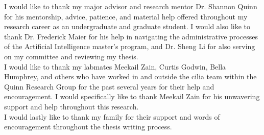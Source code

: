 \documentclass[./dissertation.tex]{subfiles}
\begin{document}
  
  I would like to thank my major advisor and research mentor Dr. Shannon Quinn for his mentorship, advice, patience, and material help offered throughout my research career as an undergraduate and graduate student. I would also like to thank Dr. Frederick Maier for his help in navigating the administrative processes of the Artificial Intelligence master's program, and Dr. Sheng Li for also serving on my committee and reviewing my thesis. \\
  
  I would like to thank my labmates Meekail Zain, Curtis Godwin, Bella Humphrey, and others who have worked in and outside the cilia team within the Quinn Research Group for the past several years for their help and encouragement. I would specifically like to thank Meekail Zain for his unwavering support and help throughout this research. \\
  
  I would lastly like to thank my family for their support and words of encouragement throughout the thesis writing process. 
\end{document}
